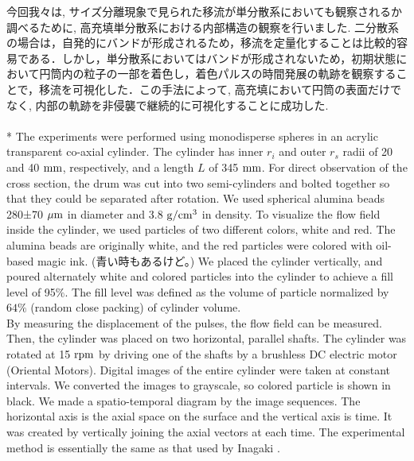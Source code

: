 \documentclass[prl,twocolumn,superscriptaddress]{revtex4}
\begin{document}
今回我々は, サイズ分離現象で見られた移流が単分散系においても観察されるか調べるために, 高充填単分散系における内部構造の観察を行いました. 
二分散系の場合は，自発的にバンドが形成されるため，移流を定量化することは比較的容易である．しかし，単分散系においてはバンドが形成されないため，初期状態において円筒内の粒子の一部を着色し，着色パルスの時間発展の軌跡を観察することで，移流を可視化した．この手法によって, 高充填において円筒の表面だけでなく, 内部の軌跡を非侵襲で継続的に可視化することに成功した. \\
\\*
The experiments were performed using monodisperse spheres in an acrylic transparent co-axial cylinder.
The cylinder has inner $r_i$ and outer $r_s$ radii of 20 and 40 $\rm{mm}$, respectively, and a length $L$ of 345 $\rm{mm}$. 
For direct observation of the cross section, the drum was cut into two semi-cylinders and bolted together so that they could be separated after rotation.
We used spherical alumina beads 280±70 $\rm{\mu m}$ in diameter and 3.8 $\rm{g/cm^3}$ in density. %
To visualize the flow field inside the cylinder, we used particles of two different colors, white and red.
The alumina beads are originally white, and the red particles were colored with oil-based magic ink. (青い時もあるけど。)
We placed the cylinder vertically, and poured alternately white and colored particles into the cylinder to achieve a fill level of 95$\%$.
The fill level was defined as the volume of particle normalized by $64\%$ (random close packing) of cylinder volume. \\
By measuring the displacement of the pulses, the flow field can be measured.
Then, the cylinder was placed on two horizontal, parallel shafts. %
The cylinder was rotated at 15 $\rm{rpm}$ by driving one of the shafts by a brushless DC electric motor (Oriental Motors). Digital images of the entire cylinder were taken at constant intervals. 
We converted the images to grayscale, so colored particle is shown in black. We made a spatio-temporal diagram by the image sequences. The horizontal axis is the axial space on the surface and the vertical axis is time. It was created by vertically joining the axial vectors at each time.
The experimental method is essentially the same as that used by Inagaki \cite{Inagaki15:bidisperse}.
\end{document}
